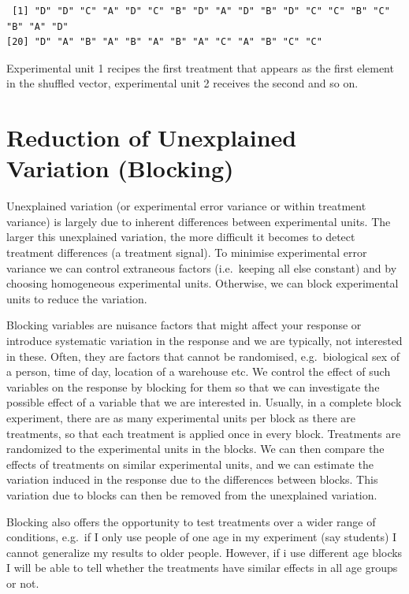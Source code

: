 \documentclass[
  letterpaper,
]{book}
\begin{document}
\begin{verbatim}
 [1] "D" "D" "C" "A" "D" "C" "B" "D" "A" "D" "B" "D" "C" "C" "B" "C" "B" "A" "D"
[20] "D" "A" "B" "A" "B" "A" "B" "A" "C" "A" "B" "C" "C"
\end{verbatim}

Experimental unit 1 recipes the first treatment that appears as the
first element in the shuffled vector, experimental unit 2 receives the
second and so on.

\section*{Reduction of Unexplained Variation
(Blocking)}\label{reduction-of-unexplained-variation-blocking}


Unexplained variation (or experimental error variance or within
treatment variance) is largely due to inherent differences between
experimental units. The larger this unexplained variation, the more
difficult it becomes to detect treatment differences (a treatment
signal). To minimise experimental error variance we can control
extraneous factors (i.e.~keeping all else constant) and by choosing
homogeneous experimental units. Otherwise, we can block experimental
units to reduce the variation.

Blocking variables are nuisance factors that might affect your response
or introduce systematic variation in the response and we are typically,
not interested in these. Often, they are factors that cannot be
randomised, e.g.~biological sex of a person, time of day, location of a
warehouse etc. We control the effect of such variables on the response
by blocking for them so that we can investigate the possible effect of a
variable that we are interested in. Usually, in a complete block
experiment, there are as many experimental units per block as there are
treatments, so that each treatment is applied once in every block.
Treatments are randomized to the experimental units in the blocks. We
can then compare the effects of treatments on similar experimental
units, and we can estimate the variation induced in the response due to
the differences between blocks. This variation due to blocks can then be
removed from the unexplained variation.

Blocking also offers the opportunity to test treatments over a wider
range of conditions, e.g.~if I only use people of one age in my
experiment (say students) I cannot generalize my results to older
people. However, if i use different age blocks I will be able to tell
whether the treatments have similar effects in all age groups or not.
\end{document}
